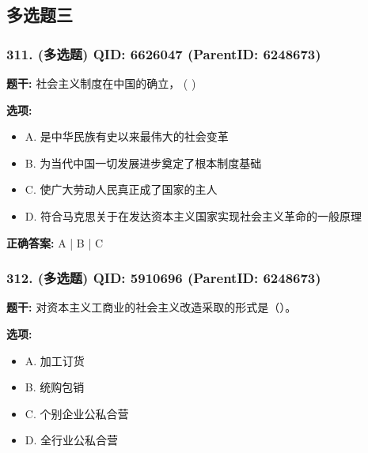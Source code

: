 \documentclass[12pt,UTF8]{ctexart}
\begin{document}
\subsection*{多选题三}

\subsubsection*{311. (多选题) \small QID: 6626047 (ParentID: 6248673)}

\textbf{题干:}
社会主义制度在中国的确立，  ( )



\textbf{选项:}
\begin{itemize}[leftmargin=*]

  \item A. 是中华民族有史以来最伟大的社会变革

  \item B. 为当代中国一切发展进步奠定了根本制度基础

  \item C. 使广大劳动人民真正成了国家的主人

  \item D. 符合马克思关于在发达资本主义国家实现社会主义革命的一般原理

\end{itemize}

\textbf{正确答案:}
A | B | C

\vspace{0.3em}\hrulefill\vspace{0.7em}

\subsubsection*{312. (多选题) \small QID: 5910696 (ParentID: 6248673)}

\textbf{题干:}
对资本主义工商业的社会主义改造采取的形式是（）。



\textbf{选项:}
\begin{itemize}[leftmargin=*]

  \item A. 加工订货

  \item B. 统购包销

  \item C. 个别企业公私合营

  \item D. 全行业公私合营

\end{itemize}
\end{document}
